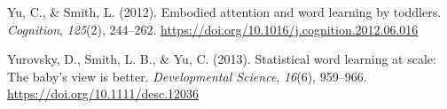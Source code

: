 \documentclass[
  man,floatsintext]{apa6}
\newlength{\cslhangindent}
\newlength{\cslentryspacingunit} %
\newenvironment{CSLReferences}[2] %
 {%
  \setlength{\parindent}{0pt}
  \ifodd #1
  \let\oldpar\par
  \def\par{\hangindent=\cslhangindent\oldpar}
  \fi
  \setlength{\parskip}{#2\cslentryspacingunit}
 }%
 {}
\begin{document}
\begin{CSLReferences}{1}{0}
\leavevmode{}%
Yu, C., \& Smith, L. (2012). Embodied attention and word learning by toddlers. \emph{Cognition}, \emph{125}(2), 244--262. \url{https://doi.org/10.1016/j.cognition.2012.06.016}

\leavevmode{}%
Yurovsky, D., Smith, L. B., \& Yu, C. (2013). Statistical word learning at scale: The baby's view is better. \emph{Developmental Science}, \emph{16}(6), 959--966. \url{https://doi.org/10.1111/desc.12036}

\end{CSLReferences}
\end{document}
